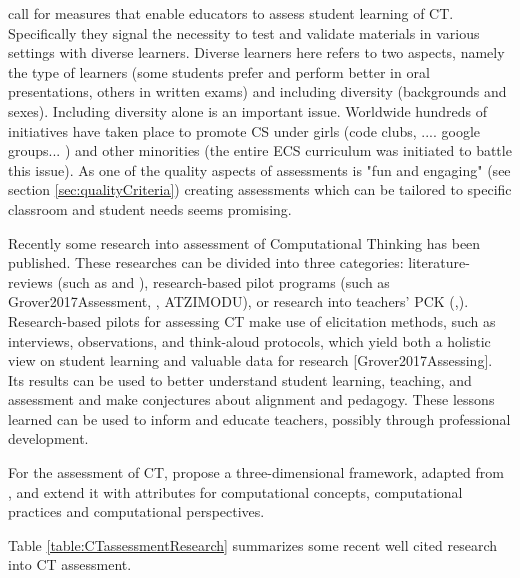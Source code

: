 call for measures that enable educators to assess student learning of CT. Specifically they signal the necessity to test and validate materials in various settings with diverse learners. Diverse learners here refers to two aspects, namely the type of learners (some students prefer and perform better in oral presentations, others in written exams) and including diversity (backgrounds and sexes). Including diversity alone is an important issue. Worldwide hundreds of initiatives have taken place to promote CS under girls (code clubs, .... google groups... ) and other minorities (the entire ECS curriculum was initiated to battle this issue). As one of the quality aspects of assessments is "fun and engaging" (see section \ref{sec:qualityCriteria}) creating assessments which can be tailored to specific classroom and student needs seems promising.

Recently some research into assessment of Computational Thinking has been published. These researches can be divided into three categories: literature-reviews (such as \cite{GroverPea2013} and \cite{crick2017}), research-based pilot programs (such as Grover2017Assessment, \cite{snow2017CTECD}, ATZIMODU), or research into teachers' PCK (\cite{Yadav2017CTteacherEd},\cite{Yadav2016}). Research-based pilots for assessing CT make use of elicitation methods, such as interviews, observations, and think-aloud protocols, which yield both a holistic view on student learning and valuable data for research [Grover2017Assessing]. Its results can be used to better understand student learning, teaching, and assessment and make conjectures about alignment and pedagogy. These lessons learned can be used to inform and educate teachers, possibly through professional development.


For the assessment of CT,  propose a three-dimensional framework, adapted from , and extend it with attributes for computational concepts, computational practices and computational perspectives.

Table \ref{table:CTassessmentResearch} summarizes some recent well cited research into CT assessment.




